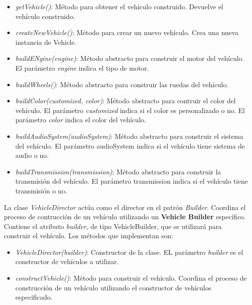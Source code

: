 \documentclass{article} %
\begin{document}
    \begin{itemize}
        \item \textit{getVehicle()}: Método para obtener el vehículo construido. Devuelve el vehículo construido.
        \item \textit{createNewVehicle()}: Método para crear un nuevo vehículo. Crea una nueva instancia de Vehicle.
        \item \textit{buildENgine(engine)}: Método abstracto para construir el motor del vehículo. 
                El parámetro \textit{engine} indica el tipo de motor.
        \item \textit{buildWheels()}: Método abstracto para construir las ruedas del vehículo.
        \item \textit{buildColor(customized, color)}: Método abstracto para contruir el color del vehículo.
                El parámetro \textit{customized} indica si el color es personalizado o no.
                El parámetro \textit{color} indica el color del vehículo.
        \item \textit{buildAudioSystem(audioSystem)}: Método abstracto para construir el sistema del vehículo. 
                El parámetro audioSystem indica si el vehículo tiene sistema de audio o no.
        \item \textit{buildTransmission(transmission)}: Método abstracto para construir la transmisión del vehículo. 
                El parámetro transmission indica si el vehículo tiene transmisión o no.
    \end{itemize}

    \hspace*{1cm}La clase \textit{VehicleDirector} actúa como el director en el patrón \textit{Builder}. 
            Coordina el proceso de contrucción de un vehículo utilizando un \textbf{Vehicle Builder} específico. 
            Contiene el atributo \textit{builder}, de tipo VehicleBuilder, que se utilizará para construir el vehículo.
    Los métodos que implementan son:

    \begin{itemize}
        \item \textit{VehicleDirector(builder)}: Constructor de la clase. EL parámetro \textit{builder} es el constructor de vehículos a utilizar.
        \item \textit{constructVehicle()}: Método para construir el vehículo. 
                Coordina el proceso de construcción de un vehículo utilizando el constructor de vehículos especificado.
    \end{itemize}
\end{document}
